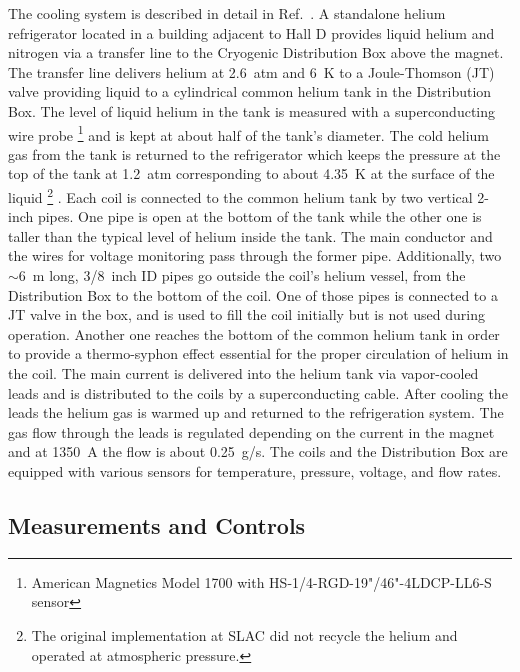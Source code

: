 The cooling system is described in detail in Ref.~\cite{Lavendure:2014:refrig}.
A standalone helium refrigerator located
in a building adjacent to Hall D provides liquid helium and nitrogen
via a transfer line to the Cryogenic Distribution Box above the
magnet. The transfer line delivers helium at 2.6~atm and 6~K to a Joule-Thomson
(JT) valve providing liquid to a cylindrical common helium tank in the
Distribution Box. The level of liquid helium in the tank is measured
with a superconducting wire probe%
\footnote{
  American Magnetics Model 1700 with HS-1/4-RGD-19"/46"-4LDCP-LL6-S sensor
}
 and is kept at about half of the tank's diameter. The cold helium gas
 from the tank is returned to the refrigerator which keeps the
 pressure at the top of the tank at 1.2~atm corresponding to about
 4.35~K at the surface of the liquid%
\footnote{
  The original implementation at SLAC did not recycle the helium and
  operated at atmospheric pressure.
}
.
Each coil is connected to the common helium tank by two vertical 2-inch
pipes.  One pipe is open at the bottom of the tank while the other one
is taller than the typical level of helium inside the tank. The main
conductor and the wires for voltage monitoring pass through the former
pipe. Additionally, two $\sim$6~m long, 3/8~inch ID pipes go outside
the coil's helium vessel, from the Distribution Box to the bottom of
the coil. One of those pipes is connected to a JT valve in the box,
and is used to fill the coil initially but is not used during operation.
Another one reaches the bottom of
the common helium tank in order to provide 
a thermo-syphon effect essential
for the proper circulation of helium in the coil. The main current is
delivered into the helium tank via vapor-cooled leads and is
distributed to the coils by a superconducting cable. After cooling the
leads the helium gas is warmed up and returned to the refrigeration
system. The gas flow through the leads is regulated depending on the
current in the magnet and at 1350~A the flow is about 0.25~g/s. The
coils and the Distribution Box are equipped with various sensors for
temperature, pressure, voltage, and flow rates.

\subsection[Measurements and Controls]{
         Measurements and Controls
        \label{sec:sol:controls}
}

